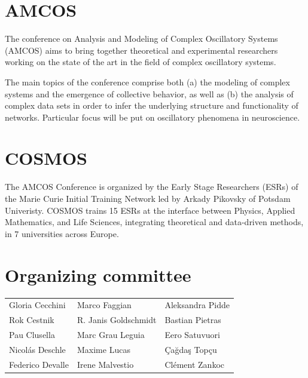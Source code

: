 \documentclass[
openany, %
parskip=full, %
12pt, %
a4paper, %
]{conferencebooklet} %
\begin{document}
	\section{AMCOS}
	
	The conference on Analysis and Modeling of Complex Oscillatory Systems (AMCOS) aims to bring together theoretical and experimental researchers working on the state of the art in the field of complex oscillatory systems.
	
	The main topics of the conference comprise both (a) the modeling of complex systems and the emergence of collective behavior, as well as (b) the analysis of complex data sets in order to infer the underlying structure and functionality of networks. Particular focus will be put on oscillatory phenomena in neuroscience.
	
	\section{COSMOS}
	
	The AMCOS Conference is organized by the Early Stage Researchers (ESRs) of the Marie Curie Initial Training Network led by Arkady Pikovsky of Potsdam Univeristy. COSMOS trains 15 ESRs at the interface between Physics, Applied Mathematics, and Life Sciences, integrating theoretical and data-driven methods, in 7 universities across Europe.
	
	\section{Organizing committee}
	
	\begin{center}
		\begin{tabular}{l l l}
			Gloria Cecchini & Marco Faggian &  Aleksandra Pidde \\
			Rok Cestnik & R. Janis Goldschmidt &  Bastian Pietras\\
			Pau Clusella  & Marc Grau Leguia & Eero Satuvuori \\
			Nicolás Deschle & Maxime Lucas   &  Çağdaş Topçu \\
			Federico Devalle  & Irene Malvestio  & Clément Zankoc
		\end{tabular}
	\end{center}
	
	
\end{document}
